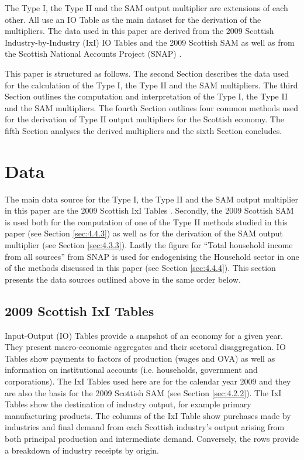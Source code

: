 \begin{doublespacing}
\bigskip

The Type I, the Type II and the SAM output multiplier are extensions of each other. All use an IO Table as the main dataset for the derivation of the multipliers. The data used in this paper are derived from the 2009 Scottish Industry-by-Industry (IxI) IO Tables and the 2009 Scottish SAM  as well as from the Scottish National Accounts Project (SNAP) \cite{ScotGov2013c}.

\bigskip

This paper is structured as follows. The second Section describes the data used for the calculation of the Type I, the Type II and the SAM multipliers. The third Section outlines the computation and interpretation of the Type I, the Type II and the SAM multipliers. The fourth Section outlines four common methods used for the derivation of Type II output multipliers for the Scottish economy. The fifth Section analyses the derived multipliers and the sixth Section concludes.

\newpage


\section{Data}
\label{sec:4.2}

The main data source for the Type I, the Type II and the SAM output multiplier in this paper are the 2009 Scottish IxI Tables \cite{ScottishGovernment2013a}. Secondly, the 2009 Scottish SAM is used both for the computation of one of the Type II methods studied in this paper (see Section \ref{sec:4.4.3}) as well as for the derivation of the SAM output multiplier (see Section \ref{sec:4.3.3}). Lastly the figure for ``Total household income from all sources'' from SNAP is used for endogenising the Household sector in one of the methods discussed in this paper (see Section \ref{sec:4.4.4}). This section presents the data sources outlined above in the same order below.

\subsection{2009 Scottish IxI Tables}
\label{sec:4.2.1}

Input-Output (IO) Tables provide a snapshot of an economy for a given year. They present macro-economic aggregates and their sectoral disaggregation. IO Tables show payments to factors of production (wages and OVA) as well as information on institutional accounts (i.e. households, government and corporations). The IxI Tables used here are for the calendar year 2009 and they are also the basis for the 2009 Scottish SAM (see Section \ref{sec:4.2.2}). The IxI Tables show the destination of industry output, for example primary manufacturing products. The columns of the IxI Table show purchases made by industries and final demand from each Scottish industry's output arising from both principal production and intermediate demand. Conversely, the rows provide a breakdown of industry receipts by origin.


\end{doublespacing}
